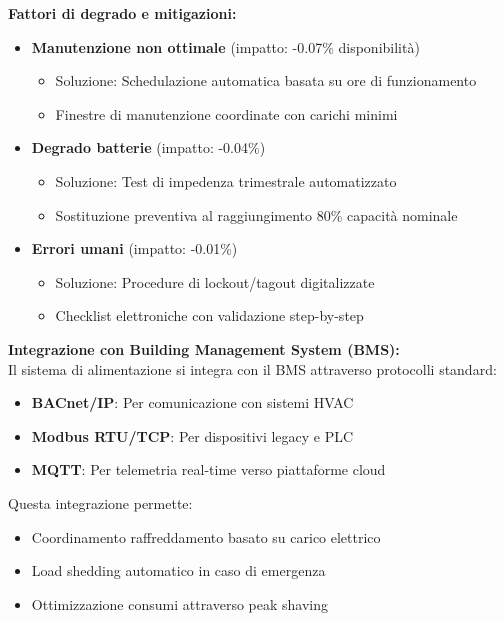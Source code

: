 \textbf{Fattori di degrado e mitigazioni:}
\begin{itemize}
    \item \textbf{Manutenzione non ottimale} (impatto: -0.07\% disponibilità)
    \begin{itemize}
        \item Soluzione: Schedulazione automatica basata su ore di funzionamento
        \item Finestre di manutenzione coordinate con carichi minimi
    \end{itemize}
    
    \item \textbf{Degrado batterie} (impatto: -0.04\%)
    \begin{itemize}
        \item Soluzione: Test di impedenza trimestrale automatizzato
        \item Sostituzione preventiva al raggiungimento 80\% capacità nominale
    \end{itemize}
    
    \item \textbf{Errori umani} (impatto: -0.01\%)
    \begin{itemize}
        \item Soluzione: Procedure di lockout/tagout digitalizzate
        \item Checklist elettroniche con validazione step-by-step
    \end{itemize}
\end{itemize}

\textbf{Integrazione con Building Management System (BMS):}\\
Il sistema di alimentazione si integra con il BMS attraverso protocolli standard:
\begin{itemize}
    \item \textbf{BACnet/IP}: Per comunicazione con sistemi HVAC
    \item \textbf{Modbus RTU/TCP}: Per dispositivi legacy e PLC
    \item \textbf{MQTT}: Per telemetria real-time verso piattaforme cloud
\end{itemize}

Questa integrazione permette:
\begin{itemize}
    \item Coordinamento raffreddamento basato su carico elettrico
    \item Load shedding automatico in caso di emergenza
    \item Ottimizzazione consumi attraverso peak shaving
\end{itemize}

